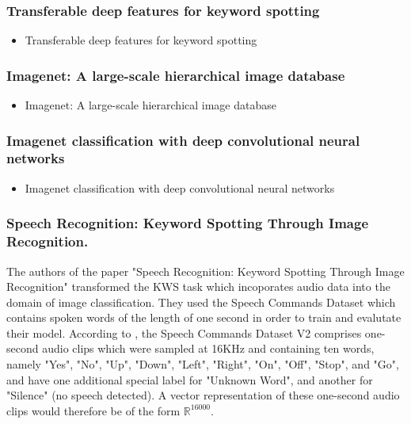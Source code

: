 \documentclass{article}
\theoremstyle{definition}
\theoremstyle{remark}
\begin{document}
\subsubsection{Transferable deep features for keyword spotting}


\begin{itemize}
	\item Transferable deep features for keyword spotting \cite{retsinas2018transferable}
\end{itemize}

\subsubsection{Imagenet: A large-scale hierarchical image database}

\begin{itemize}
	\item Imagenet: A large-scale hierarchical image database \cite{deng2009imagenet}
\end{itemize}


\subsubsection{Imagenet classification with deep convolutional neural networks}

\begin{itemize}
	\item Imagenet classification with deep convolutional neural networks \cite{krizhevsky2012imagenet}
\end{itemize}

\subsubsection{Speech Recognition: Keyword Spotting Through Image Recognition.}

The authors of the paper "Speech Recognition: Keyword Spotting Through Image Recognition" \cite{gouda2018speech} transformed the KWS task which incoporates audio data into the domain of image classification. They used the Speech Commands Dataset \cite{warden2018speech} which contains spoken words of the length of one second in order to train and evalutate their model. According to \cite{warden2018speech}, the Speech Commands Dataset V2 \cite{scd_v2} comprises one-second audio clips which were sampled at 16KHz and containing ten words, namely "Yes", "No", "Up", "Down", "Left", "Right", "On", "Off", "Stop", and "Go", and have one additional special label for "Unknown Word", and another for "Silence" (no speech detected). A vector representation of these one-second audio clips would therefore be of the form  $\mathbb{R}^{16000}$.\\
\end{document}
